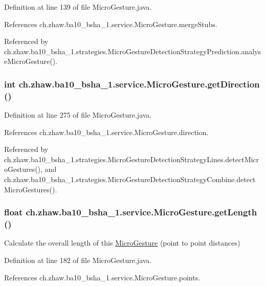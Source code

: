 Definition at line 139 of file MicroGesture.java.

References ch.zhaw.ba10\_\-bsha\_\-1.service.MicroGesture.mergeStubs.

Referenced by ch.zhaw.ba10\_\-bsha\_\-1.strategies.MicroGestureDetectionStrategyPrediction.analyseMicroGesture().\hypertarget{classch_1_1zhaw_1_1ba10__bsha__1_1_1service_1_1MicroGesture_a43e707803f3820e6f8cae56d1f1976b7}{
\subsubsection[{getDirection}]{\setlength{\rightskip}{0pt plus 5cm}int ch.zhaw.ba10\_\-bsha\_\-1.service.MicroGesture.getDirection ()}}
\label{classch_1_1zhaw_1_1ba10__bsha__1_1_1service_1_1MicroGesture_a43e707803f3820e6f8cae56d1f1976b7}


Definition at line 275 of file MicroGesture.java.

References ch.zhaw.ba10\_\-bsha\_\-1.service.MicroGesture.direction.

Referenced by ch.zhaw.ba10\_\-bsha\_\-1.strategies.MicroGestureDetectionStrategyLines.detectMicroGestures(), and ch.zhaw.ba10\_\-bsha\_\-1.strategies.MicroGestureDetectionStrategyCombine.detectMicroGestures().\hypertarget{classch_1_1zhaw_1_1ba10__bsha__1_1_1service_1_1MicroGesture_ad2000095a1aaed409721b5580382639f}{
\subsubsection[{getLength}]{\setlength{\rightskip}{0pt plus 5cm}float ch.zhaw.ba10\_\-bsha\_\-1.service.MicroGesture.getLength ()}}
\label{classch_1_1zhaw_1_1ba10__bsha__1_1_1service_1_1MicroGesture_ad2000095a1aaed409721b5580382639f}
Calculate the overall length of this \hyperlink{classch_1_1zhaw_1_1ba10__bsha__1_1_1service_1_1MicroGesture}{MicroGesture} (point to point distances) 

Definition at line 182 of file MicroGesture.java.

References ch.zhaw.ba10\_\-bsha\_\-1.service.MicroGesture.points.

